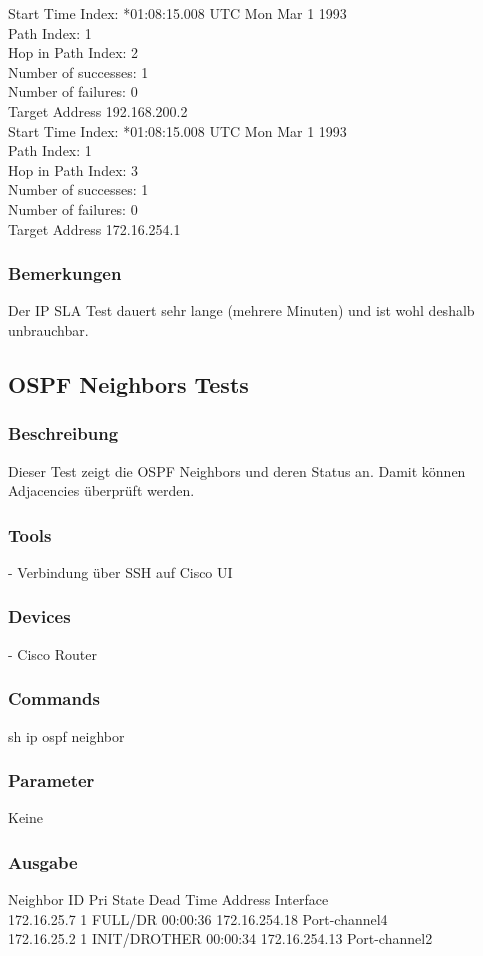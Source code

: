 \documentclass[a4,12pt]{scrartcl}
\begin{document}
\noindent Start Time Index: *01:08:15.008 UTC Mon Mar 1 1993\\
Path Index: 1\\
Hop in Path Index: 2\\
Number of successes: 1\\
Number of failures: 0\\
Target Address 192.168.200.2\\

\noindent Start Time Index: *01:08:15.008 UTC Mon Mar 1 1993\\
Path Index: 1\\
Hop in Path Index: 3\\
Number of successes: 1\\
Number of failures: 0\\
Target Address 172.16.254.1
\subsubsection{Bemerkungen}
Der IP SLA Test dauert sehr lange (mehrere Minuten) und ist wohl deshalb unbrauchbar.

\subsection{OSPF Neighbors Tests}
\subsubsection{Beschreibung}
Dieser Test zeigt die OSPF Neighbors und deren Status an. Damit können Adjacencies überprüft werden.
\subsubsection{Tools}
- Verbindung über SSH auf Cisco UI
\subsubsection{Devices}
- Cisco Router
\subsubsection{Commands}
sh ip ospf neighbor
\subsubsection{Parameter}
Keine
\subsubsection{Ausgabe}
Neighbor ID     Pri   State           Dead Time   Address         Interface\\
172.16.25.7       1   FULL/DR         00:00:36    172.16.254.18   Port-channel4\\
172.16.25.2       1   INIT/DROTHER    00:00:34    172.16.254.13   Port-channel2
\end{document}
